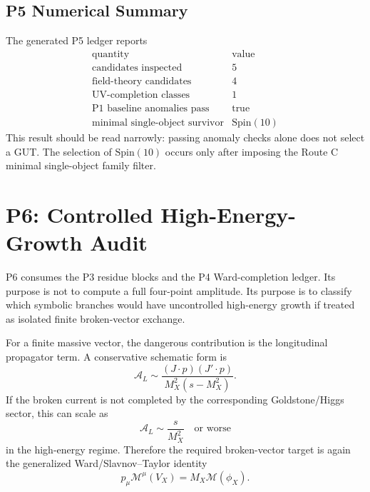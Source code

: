 \documentclass[11pt]{article}
\newcommand{\Spin}{\mathrm{Spin}}
\begin{document}
\subsection{P5 Numerical Summary}

The generated P5 ledger reports
\begin{equation}
\begin{array}{c|c}
\text{quantity} & \text{value}\\
\hline
\text{candidates inspected} & 5\\
\text{field-theory candidates} & 4\\
\text{UV-completion classes} & 1\\
\text{P1 baseline anomalies pass} & \text{true}\\
\text{minimal single-object survivor} & \Spin(10)
\end{array}
\end{equation}
This result should be read narrowly: passing anomaly checks alone does not
select a GUT.  The selection of $\Spin(10)$ occurs only after imposing the
Route C minimal single-object family filter.

\section{P6: Controlled High-Energy-Growth Audit}

P6 consumes the P3 residue blocks and the P4 Ward-completion ledger.  Its
purpose is not to compute a full four-point amplitude.  Its purpose is to
classify which symbolic branches would have uncontrolled high-energy growth
if treated as isolated finite broken-vector exchange.

For a finite massive vector, the dangerous contribution is the longitudinal
propagator term.  A conservative schematic form is
\begin{equation}
  \mathcal A_L
  \sim
  \frac{(J\cdot p)(J'\cdot p)}{M_X^2(s-M_X^2)}.
\end{equation}
If the broken current is not completed by the corresponding Goldstone/Higgs
sector, this can scale as
\begin{equation}
  \mathcal A_L \sim \frac{s}{M_X^2}
  \quad\text{or worse}
\end{equation}
in the high-energy regime.  Therefore the required broken-vector target is
again the generalized Ward/Slavnov--Taylor identity
\begin{equation}
  p_\mu\mathcal M^\mu(V_X)=M_X\mathcal M(\phi_X).
\end{equation}
\end{document}
